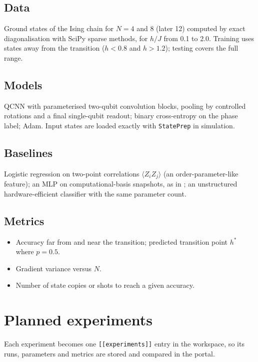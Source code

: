 \documentclass[11pt,a4paper]{article}
\begin{document}
\subsection{Data}
Ground states of the Ising chain for $N=4$ and 8 (later 12) computed by exact diagonalisation with
SciPy sparse methods, for $h/J$ from 0.1 to 2.0. Training uses states away from the transition
($h<0.8$ and $h>1.2$); testing covers the full range.

\subsection{Models}
QCNN with parameterised two-qubit convolution blocks, pooling by controlled rotations and a final
single-qubit readout; binary cross-entropy on the phase label; Adam. Input states are loaded exactly
with \texttt{StatePrep} in simulation.

\subsection{Baselines}
Logistic regression on two-point correlations $\langle Z_iZ_j\rangle$ (an order-parameter-like
feature); an MLP on computational-basis snapshots, as in \citet{carrasquilla2017}; an unstructured
hardware-efficient classifier with the same parameter count.

\subsection{Metrics}
\begin{itemize}
  \item Accuracy far from and near the transition; predicted transition point $h^*$ where $p=0.5$.
  \item Gradient variance versus $N$.
  \item Number of state copies or shots to reach a given accuracy.
\end{itemize}

\section{Planned experiments}
Each experiment becomes one \texttt{[[experiments]]} entry in the workspace, so its runs, parameters
and metrics are stored and compared in the portal.
\end{document}
